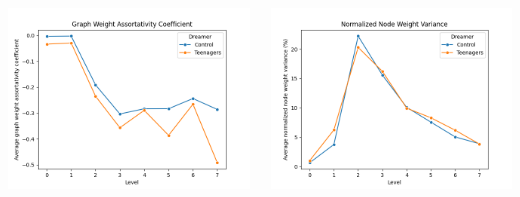 \begin{minipage}[t]{\textwidth}
\begin{columns}
    \begin{column}{0.45\textwidth}
        \includegraphics[width=\textwidth]{immagini/Graph_weight_assortativity_coefficient_teens}
    \end{column}
    \begin{column}{0.45\textwidth}
        \includegraphics[width=\textwidth]{immagini/Normalized_node_weight_variance_teens}
    \end{column}
    \end{columns}
\end{minipage}